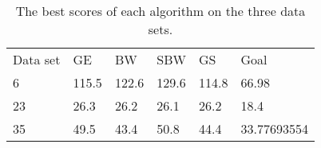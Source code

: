 \begin{table}[h]
\begin{tabular}{llllll}
Data set & GE    & BW    & SBW   & GS    & Goal        \\
6        & 115.5 & 122.6 & 129.6 & 114.8 & 66.98       \\
23       & 26.3  & 26.2  & 26.1  & 26.2  & 18.4        \\
35       & 49.5  & 43.4  & 50.8  & 44.4  & 33.77693554
\end{tabular}
\label{table:pautomac-best-score}\caption{The best scores of each algorithm on the three data sets.}
\end{table}
